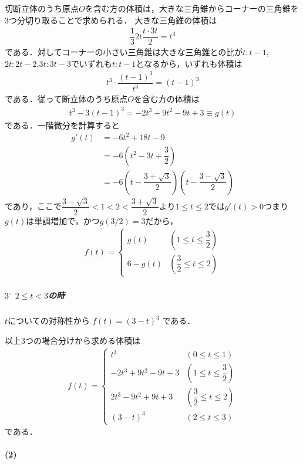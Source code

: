 \documentclass[../../main.tex]{subfiles}
\begin{document}
切断立体のうち原点$O$を含む方の体積は，大きな三角錐からコーナーの三角錐を3つ分切り取ることで求められる．
大きな三角錐の体積は
\begin{align}
  \dfrac{1}{3}2t \dfrac{t\cdot 3t}{2} = t^3
\end{align}
である．対してコーナーの小さい三角錐は大きな三角錐との比が$t:t-1$, $2t:2t-2$,$3t:3t-3$でいずれも$t:t-1$となるから，いずれも体積は
\begin{align}
  t^3\cdot \dfrac{(t-1)^3}{t^3} = (t-1)^3
\end{align}
である．従って断立体のうち原点$O$を含む方の体積は
\begin{align}
  t^3-3(t-1)^3=-2t^3+9t^2-9t+3 \equiv g(t)
\end{align}
である．一階微分を計算すると
\begin{align}
  g'(t)
  &= -6t^2+18t-9 \\
  &= -6\left(t^2-3t+\dfrac{3}{2}\right) \\
  &= -6\left(t-\dfrac{3+\sqrt{3}}{2}\right)\left(t-\dfrac{3-\sqrt{3}}{2}\right)
\end{align}
であり，ここで$\dfrac{3-\sqrt{3}}{2}<1<2<\dfrac{3+\sqrt{3}}{2}$より$1\le t \le 2$では$g'(t)>0$つまり$g(t)$は単調増加で，かつ$g(3/2)=3$だから，
\begin{align}
  f(t)=
  \begin{cases}\displaystyle
    g(t) & \left(1\le t\le\dfrac{3}{2}\right) \\
    6-g(t) & \left(\dfrac{3}{2}\le t\le2\right)
  \end{cases}
\end{align}

\subparagraph{$3^\circ$ $2\le t<3$の時}

$t$についての対称性から $f(t)=(3-t)^3$ である．

以上3つの場合分けから求める体積は
\begin{align}
  f(t)=
  \begin{cases}\displaystyle
    t^3 & (0\le t\le1) \\
    -2t^3+9t^2-9t+3 & \left(1\le t\le\dfrac{3}{2}\right) \\
    2t^3-9t^2+9t+3 & \left(\dfrac{3}{2}\le t\le2\right) \\
    (3-t)^3 & (2\le t\le3)
  \end{cases}
\end{align}
である．

\paragraph{(2)}
\end{document}
